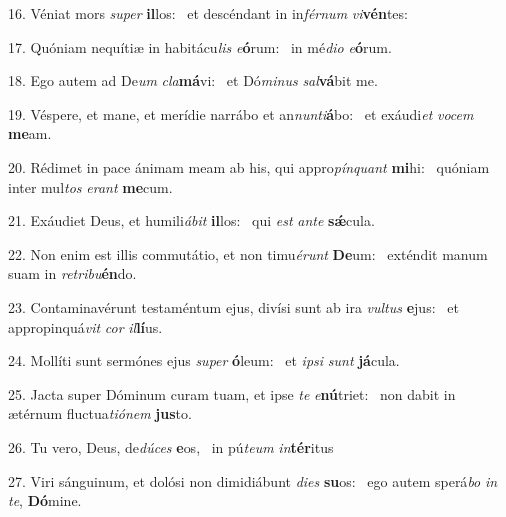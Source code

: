 16. Véniat mors \textit{su}\textit{per} \textbf{il}los: \ast\  et descéndant in in\textit{fér}\textit{num} \textit{vi}\textbf{vén}tes:\

17. Quóniam nequítiæ in habitácu\textit{lis} \textit{e}\textbf{ó}rum: \ast\  in mé\textit{di}\textit{o} \textit{e}\textbf{ó}rum.\

18. Ego autem ad De\textit{um} \textit{cla}\textbf{má}vi: \ast\  et Dó\textit{mi}\textit{nus} \textit{sal}\textbf{vá}bit me.\

19. Véspere, et mane, et merídie narrábo et an\textit{nun}\textit{ti}\textbf{á}bo: \ast\  et exáudi\textit{et} \textit{vo}\textit{cem} \textbf{me}am.\

20. Rédimet in pace ánimam meam ab his, qui appro\textit{pín}\textit{quant} \textbf{mi}hi: \ast\  quóniam inter mul\textit{tos} \textit{e}\textit{rant} \textbf{me}cum.\

21. Exáudiet Deus, et humili\textit{á}\textit{bit} \textbf{il}los: \ast\  qui \textit{est} \textit{an}\textit{te} \textbf{sǽ}cula.\

22. Non enim est illis commutátio, et non timu\textit{é}\textit{runt} \textbf{De}um: \ast\  exténdit manum suam in \textit{re}\textit{tri}\textit{bu}\textbf{én}do.\

23. Contaminavérunt testaméntum ejus, divísi sunt ab ira \textit{vul}\textit{tus} \textbf{e}jus: \ast\  et appropinquá\textit{vit} \textit{cor} \textit{il}\textbf{lí}us.\

24. Mollíti sunt sermónes ejus \textit{su}\textit{per} \textbf{ó}leum: \ast\  et \textit{ip}\textit{si} \textit{sunt} \textbf{já}cula.\

25. Jacta super Dóminum curam tuam, et ipse \textit{te} \textit{e}\textbf{nú}triet: \ast\  non dabit in ætérnum fluctua\textit{ti}\textit{ó}\textit{nem} \textbf{jus}to.\

26. Tu vero, Deus, de\textit{dú}\textit{ces} \textbf{e}os, \ast\  in pú\textit{te}\textit{um} \textit{in}\textbf{tér}itus\

27. Viri sánguinum, et dolósi non dimidiábunt \textit{di}\textit{es} \textbf{su}os: \ast\  ego autem sperá\textit{bo} \textit{in} \textit{te}, \textbf{Dó}mine.\

